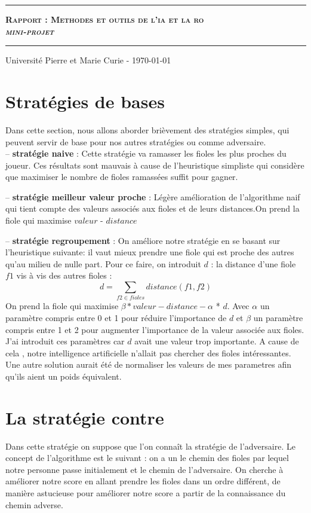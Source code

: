 \documentclass[11pt]{article}
\date{}
\author{\scshape Becirspahic Lucas}
\makeatletter
\renewcommand{\maketitle}{
\begin{titlepage}%
    \vspace*{7cm}
	\hrule
	\begin{center}
		{\bfseries \scshape {\huge Rapport : Methodes et outils de l'ia et la ro} \\[1em] {\itshape \LARGE mini-projet}}
	\end{center}
	\vspace{1em}
	\hrule
	 \begin{center}
      \Large \@author \par
    \end{center}	
    \vfill
	\begin{center}
	Université Pierre et Marie Curie - \today
	\end{center}
    \end{titlepage}
}
\makeatother
\begin{document}
\maketitle





\section{Stratégies de bases}
Dans cette section, nous allons aborder brièvement des stratégies simples, qui peuvent servir de base pour nos autres stratégies ou comme adversaire. \\
-- \textbf {stratégie naive} : Cette stratégie va ramasser les fioles les plus proches du joueur. Ces résultats sont mauvais à cause de l'heuristique simpliste qui considère que maximiser le nombre de fioles ramassées suffit pour gagner.

-- \textbf {stratégie meilleur valeur proche} : Légère amélioration de l'algorithme naif qui tient compte des valeurs associés aux fioles et de leurs distances.On prend la fiole qui maximise $valeur$ - $distance$

-- \textbf {stratégie regroupement} : On améliore notre stratégie en se basant sur l'heuristique suivante: il vaut mieux prendre une fiole qui est proche des autres qu'au milieu de nulle part. Pour ce faire, on introduit $d$ : la distance d'une fiole $f1$ vis à vis des autres fioles : \\
\[ d = \sum_{f2 \in fioles} distance(f1,f2) \]
On prend la fiole qui maximise $\beta*valeur -distance - \alpha$ * $d$. Avec $\alpha$ un paramètre compris entre 0 et 1 pour réduire l'importance de $d$ et $\beta$ un paramètre compris entre 1 et 2 pour augmenter l'importance de la valeur associée aux fioles. J'ai introduit ces paramètres car $d$ avait une valeur trop importante. A cause de cela , notre intelligence artificielle n'allait pas chercher des fioles intéressantes. Une autre solution aurait été de normaliser les valeurs de mes parametres afin qu'ils aient un poids équivalent.

\section{La stratégie contre}

Dans cette stratégie on suppose que l'on connaît la stratégie de l'adversaire.
Le concept de l'algorithme est le suivant : on a un le chemin des fioles par lequel notre personne passe initialement et le chemin de l'adversaire. On cherche à améliorer notre score en allant prendre les fioles dans un ordre différent, de manière astucieuse pour améliorer notre score a partir de la connaissance du chemin adverse.
\end{document}
